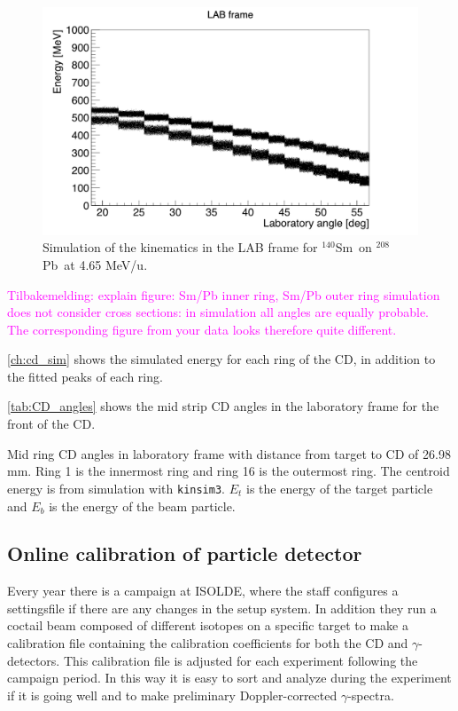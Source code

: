 \documentclass[twoside,english]{uiofysmaster/uiofysmaster}
\newcommand{\Sm}{$^{140}$Sm} %
\newcommand{\Pb}{$^{208}$Pb}
\newcommand{\ga}{$\gamma$}
\begin{document}
\begin{figure}[ht]
	\centering
    \includegraphics[width=\linewidth]{../Plots/simulation/kin_140Sm_208Pb.png}
	\caption{Simulation of the kinematics in the LAB frame for \Sm\ on \Pb\ at 4.65 MeV/u.}
	\label{fig:kinsim}
\end{figure}

\textcolor{Magenta}{Tilbakemelding: \newline 
explain figure: Sm/Pb inner ring, Sm/Pb outer ring \newline
simulation does not consider cross sections: in simulation all angles are equally probable. The corresponding figure from your data looks therefore quite different.
}


\autoref{ch:cd_sim} shows the simulated energy for each ring of the CD, in addition to the fitted peaks of each ring.


\autoref{tab:CD_angles} shows the mid strip CD angles in the laboratory frame for the front of the CD. 

\begin{table}[ht] 
    \centering 
    \caption{Mid ring CD angles in laboratory frame with distance from target to CD of 26.98 mm. Ring 1 is the innermost ring and ring 16 is the outermost ring. The centroid energy is from simulation with \texttt{kinsim3}. $E_t$ is the energy of the target particle and $E_b$ is the energy of the beam particle.}
	
	\label{tab:CD_angles}
\end{table}




\subsection{Online calibration of particle detector}
Every year there is a campaign at ISOLDE, where the staff configures a settingsfile if there are any changes in the setup system. In addition they run a coctail beam composed of different isotopes on a specific target to make a calibration file containing the calibration coefficients for both the CD and \ga-detectors. This calibration file is adjusted for each experiment following the campaign period. In this way it is easy to sort and analyze during the experiment if it is going well and to make preliminary Doppler-corrected \ga-spectra. 
\end{document}
